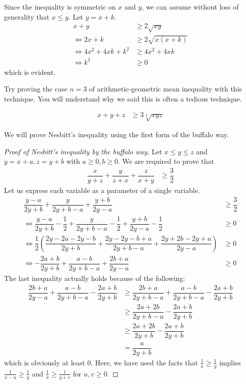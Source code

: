 \documentclass{subfile}
\begin{document}
		\begin{solution}
			Since the inequality is symmetric on $x$ and $y$, we can assume without loss of generality that $x\leq y$. Let $y=x+k$.
				\begin{align*}
					x+y
						& \geq2\sqrt{xy}\\
					\iff2x+k
						& \geq2\sqrt{x(x+k)}\\
					\iff4x^2+4xk+k^2
						& \geq4x^2+4xk\\
					\iff k^2
						& \geq0
				\end{align*}
			which is evident.
		\end{solution}
	Try proving the case $n=3$ of arithmetic-geometric mean inequality with this technique. You will understand why we said this is often a tedious technique.
		\begin{problem}
			\begin{align*}
				x+y+z
					& \geq3\sqrt[3]{xyz}
			\end{align*}
		\end{problem}
	We will prove Nesbitt's inequality using the first form of the buffalo way.
		\begin{proof}[Proof of Nesbitt's inequality by the buffalo way]
			Let $x\leq y\leq z$ and $y=x+a,z=y+b$ with $a\geq0,b\geq0$. We are required to prove that
				\begin{align*}
					\dfrac{x}{y+z}+\dfrac{y}{z+x}+\dfrac{z}{x+y}
						& \geq\dfrac{3}{2}
				\end{align*}
			Let us express each variable as a parameter of a single variable.
				\begin{align*}
					\dfrac{y-a}{2y+b}+\dfrac{y}{2y+b-a}+\dfrac{y+b}{2y-a}
						& \geq\dfrac{3}{2}\\
					\iff\dfrac{y-a}{2y+b}-\dfrac{1}{2}+\dfrac{y}{2y+b-a}-\dfrac{1}{2}+\dfrac{y+b}{2y-a}-\dfrac{1}{2}
						& \geq0\\
					\iff\dfrac{1}{2}\left(\dfrac{2y-2a-2y-b}{2y+b}+\dfrac{2y-2y-b+a}{2y+b-a}+\dfrac{2y+2b-2y+a}{2y-a}\right)
						& \geq0\\
					\iff-\dfrac{2a+b}{2y+b}+\dfrac{a-b}{2y+b-a}+\dfrac{2b+a}{2y-a}
						& \geq0
				\end{align*}
			The last inequality actually holds because of the following:
				\begin{align*}
					\dfrac{2b+a}{2y-a}+\dfrac{a-b}{2y+b-a}-\dfrac{2a+b}{2y+b}
						& \geq\dfrac{2b+a}{2y+b-a}+\dfrac{a-b}{2y+b-a}-\dfrac{2a+b}{2y+b}\\
						& \geq\dfrac{2a+2b}{2y+b-a}-\dfrac{2a+b}{2y+b}\\
						& \geq\dfrac{2a+2b}{2y+b}-\dfrac{2a+b}{2y+b}\\
						& = \dfrac{a}{2y+b}
				\end{align*}
			which is obviously at least $0$. Here, we have used the facts that $\frac{1}{x}\geq\frac{1}{y}$ implies $\frac{1}{x-u}\geq\frac{1}{y}$ and $\frac{1}{x}\geq\frac{1}{y+v}$ for $u,v\geq0$.
		\end{proof}
\end{document}
